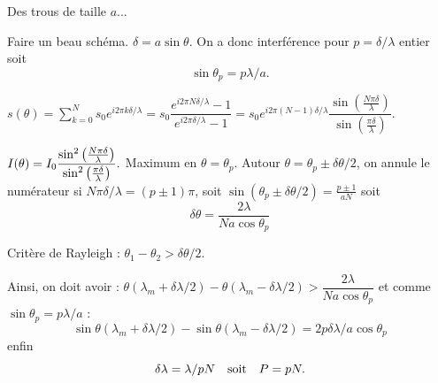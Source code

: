 \begin{solution}

\begin{questions}
\questioncours Des trous de taille $a$...

\question Faire un beau schéma. $\delta = a\sin\theta$. On a donc interférence pour $p = \delta/\lambda$ entier soit
$$\sin\theta_p = p\lambda/a.$$

\question $s(\theta) = \sum_{k=0}^{N} s_0 e^{i2\pi k \delta/\lambda} = s_0 \dfrac{e^{i2\pi N \delta/\lambda} - 1}{e^{i2\pi \delta/\lambda} - 1} = s_0 e^{i2\pi (N-1) \delta / \lambda} \dfrac{\sin(\frac{N\pi\delta}{\lambda})}{\sin(\frac{\pi\delta}{\lambda})}.$

\question $I(\theta) = I_0 \dfrac{\sin^2\qty(\frac{N\pi\delta}{\lambda})}{\sin^2\qty(\frac{\pi\delta}{\lambda})}.$
Maximum en $\theta = \theta_p$. Autour $\theta = \theta_p \pm \delta\theta/2$, on annule le numérateur si $N\pi\delta/\lambda = (p\pm1)\pi$, soit $\sin(\theta_p \pm \delta\theta/2) = \frac{p\pm1}{a N}$ soit
$$\delta\theta = \dfrac{2\lambda}{N a \cos\theta_p}$$

\question Critère de Rayleigh : $\theta_1 - \theta_2 > \delta\theta/2$.

\question Ainsi, on doit avoir : $\theta(\lambda_m + \delta\lambda/2) - \theta(\lambda_m - \delta\lambda/2) > \dfrac{2\lambda}{N a \cos\theta_p}$ et comme $\sin\theta_p = p\lambda/a$ :
$$\sin\theta(\lambda_m + \delta\lambda/2) - \sin\theta(\lambda_m - \delta\lambda/2) = 2 p\delta\lambda/a \cos\theta_p$$
enfin
$$\delta\lambda = \lambda/ pN \qqtext{soit} P = pN.$$


\end{questions}

\end{solution}

